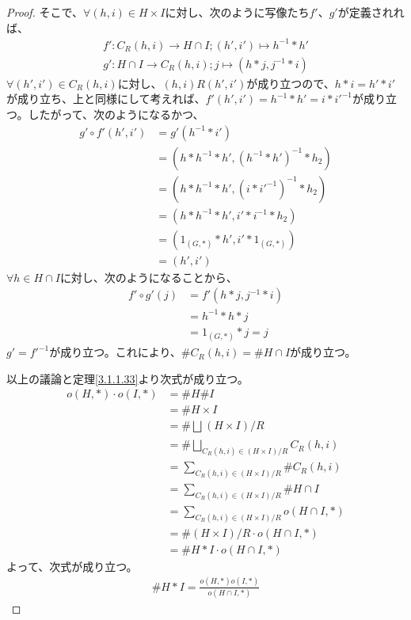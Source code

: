 \documentclass[dvipdfmx]{jsarticle}
\begin{document}
\begin{proof}
そこで、$\forall(h,i) \in H \times I$に対し、次のように写像たち$f'$、$g'$が定義されれば、
\begin{align*}
f':C_{R}(h,i) \rightarrow H \cap I;\left( h',i' \right) \mapsto h^{- 1}*h'
\end{align*}
\begin{align*}
g':H \cap I \rightarrow C_{R}(h,i);j \mapsto \left( h*j,j^{- 1}*i \right)
\end{align*}
$\forall\left( h',i' \right) \in C_{R}(h,i)$に対し、$(h,i)R\left( h',i' \right)$が成り立つので、$h*i = h'*i'$が成り立ち、上と同様にして考えれば、$f'\left( h',i' \right) = h^{- 1}*h' = i*{i'}^{- 1}$が成り立つ。したがって、次のようになるかつ、
\begin{align*}
g' \circ f'\left( h',i' \right) &= g'\left( h^{- 1}*i' \right)\\
&= \left( h*h^{- 1}*h',\left( h^{- 1}*h' \right)^{- 1}*h_{2} \right)\\
&= \left( h*h^{- 1}*h',\left( i*{i'}^{- 1} \right)^{- 1}*h_{2} \right)\\
&= \left( h*h^{- 1}*h',i'*i^{- 1}*h_{2} \right)\\
&= \left( 1_{(G,*)}*h',i'*1_{(G,*)} \right)\\
&= \left( h',i' \right)
\end{align*}
$\forall h \in H \cap I$に対し、次のようになることから、
\begin{align*}
f' \circ g'(j) &= f'\left( h*j,j^{- 1}*i \right)\\
&= h^{- 1}*h*j\\
&= 1_{(G,*)}*j = j
\end{align*}
$g' = {f'}^{- 1}$が成り立つ。これにより、$\#{C_{R}(h,i)} = \#{H \cap I}$が成り立つ。\par
以上の議論と定理\ref{3.1.1.33}より次式が成り立つ。
\begin{align*}
o(H,*) \cdot o(I,*) &= \#H\#I\\
&= \#{H \times I}\\
&= \#{\bigsqcup_{} {(H \times I)}/{R}}\\
&= \#{\bigsqcup_{C_{R}(h,i) \in {(H \times I)}/{R}} {C_{R}(h,i)}}\\
&= \sum_{C_{R}(h,i) \in {(H \times I)}/{R}} {\#{C_{R}(h,i)}}\\
&= \sum_{C_{R}(h,i) \in {(H \times I)}/{R}} {\#{H \cap I}}\\
&= \sum_{C_{R}(h,i) \in {(H \times I)}/{R}} {o(H \cap I,*)}\\
&= \#{(H \times I)}/{R} \cdot o(H \cap I,*)\\
&= \#{H*I} \cdot o(H \cap I,*)
\end{align*}
よって、次式が成り立つ。
\begin{align*}
\#{H*I} = \frac{o(H,*)o(I,*)}{o(H \cap I,*)}
\end{align*}
\end{proof}
\end{document}
